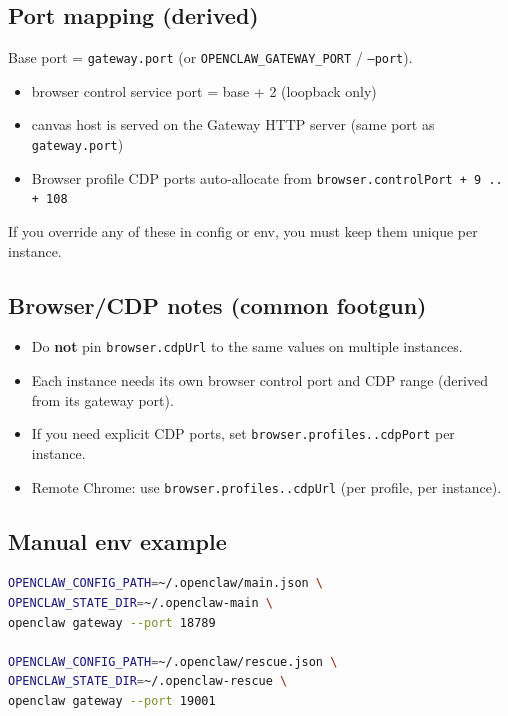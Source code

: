 \subsection{Port mapping (derived)}


Base port = \texttt{gateway.port} (or \texttt{OPENCLAW\_GATEWAY\_PORT} / \texttt{--port}).

\begin{itemize}
  \item browser control service port = base + 2 (loopback only)
  \item canvas host is served on the Gateway HTTP server (same port as \texttt{gateway.port})
  \item Browser profile CDP ports auto-allocate from \texttt{browser.controlPort + 9 .. + 108}
\end{itemize}


If you override any of these in config or env, you must keep them unique per instance.

\subsection{Browser/CDP notes (common footgun)}


\begin{itemize}
  \item Do \textbf{not} pin \texttt{browser.cdpUrl} to the same values on multiple instances.
  \item Each instance needs its own browser control port and CDP range (derived from its gateway port).
  \item If you need explicit CDP ports, set \texttt{browser.profiles..cdpPort} per instance.
  \item Remote Chrome: use \texttt{browser.profiles..cdpUrl} (per profile, per instance).
\end{itemize}


\subsection{Manual env example}


\begin{lstlisting}[language=bash]
OPENCLAW_CONFIG_PATH=~/.openclaw/main.json \
OPENCLAW_STATE_DIR=~/.openclaw-main \
openclaw gateway --port 18789

OPENCLAW_CONFIG_PATH=~/.openclaw/rescue.json \
OPENCLAW_STATE_DIR=~/.openclaw-rescue \
openclaw gateway --port 19001
\end{lstlisting}


